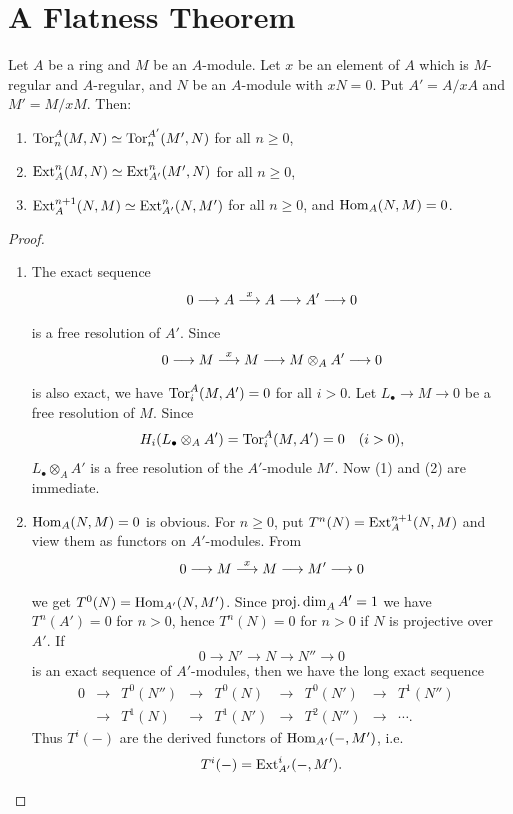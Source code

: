 \documentclass[../main]{subfiles}
\begin{document}
\section{A Flatness Theorem}\label{sec:36}

\begin{parlemma}
\label{lem:36.01}
Let $A$ be a ring and $M$ be an $A$-module. Let $x$ be an element of $A$ which is $M$-regular and $A$-regular, and $N$ be an $A$-module with $xN=0$. Put $A' = A/xA$ and $M' = M/xM$. Then:
\begin{enumerate}
    \item[(1)] $\operatorname{Tor}^{A}_n(M,N) \simeq \operatorname{Tor}^{A'}_n(M',N)$ for all $n\ge 0$,
    \item[(2)] $\operatorname{Ext}^n_A(M,N) \simeq \operatorname{Ext}^n_{A'} (M', N)$ for all $n\ge 0$,
    \item[(3)] $\operatorname{Ext}^{n+1}_A(N,M)\simeq \operatorname{Ext}^{n}_{A'}(N,M')$ for all $n\ge 0$, and $\operatorname{Hom}_A(N,M) = 0$.
\end{enumerate}
\end{parlemma}
\begin{proof}\phantom{,}
\begin{enumerate}
    \item[(1) and (2)] The exact sequence \[0\longrightarrow A\varrightarrow{x} A\longrightarrow A'\longrightarrow 0\] is a free resolution of $A'$. Since \[0\longrightarrow M\varrightarrow{x} M\longrightarrow M\otimes_A A'\longrightarrow 0\] is also exact, we have $\operatorname{Tor}^A_i(M,A')=0$ for all $i>0$. Let $L_\bullet\longrightarrow M \longrightarrow 0$ be a free resolution of $M$. Since \[H_i(L_\bullet\otimes_A A') = \Tor^A_i(M,A') = 0\for{i>0},\] $L_\bullet\otimes_A A'$ is a free resolution of the $A'$-module $M'$. Now (1) and (2) are immediate.
    \item[(3)] $\operatorname{Hom}_A(N,M)=0$ is obvious. For $n\ge 0$, put $T^n(N) = \operatorname{Ext}^{n+1}_A(N,M)$ and view them as functors on $A'$-modules. From \[0\longrightarrow M\varrightarrow{x} M \longrightarrow M'\longrightarrow 0\] we get $T^0(N) = \operatorname{Hom}_{A'}(N,M')$. Since $\operatorname{proj. dim}_A A' = 1$ we have $T^n(A') = 0$ for $n>0$, hence $T^n(N) = 0$ for $n>0$ if $N$ is projective over $A'$. If \[0\longrightarrow N'\longrightarrow N\longrightarrow N'' \longrightarrow 0\] is an exact sequence of $A'$-modules, then we have the long exact sequence \[\begin{aligned}0&\longrightarrow& T^0(N'') &\longrightarrow& T^0(N)&\longrightarrow& T^0(N')&\longrightarrow& T^1(N'')&\\ &\longrightarrow& T^1(N)&\longrightarrow& T^1(N')&\longrightarrow& T^2(N'')&\longrightarrow& \cdots.&\end{aligned}\]
    Thus $T^i(-)$ are the derived functors of $\operatorname{Hom}_{A'} (-, M')$, i.e. \[T^i(-) = \operatorname{Ext}^i_{A'}(-,M').\]
\end{enumerate}

\end{proof}
\end{document}

